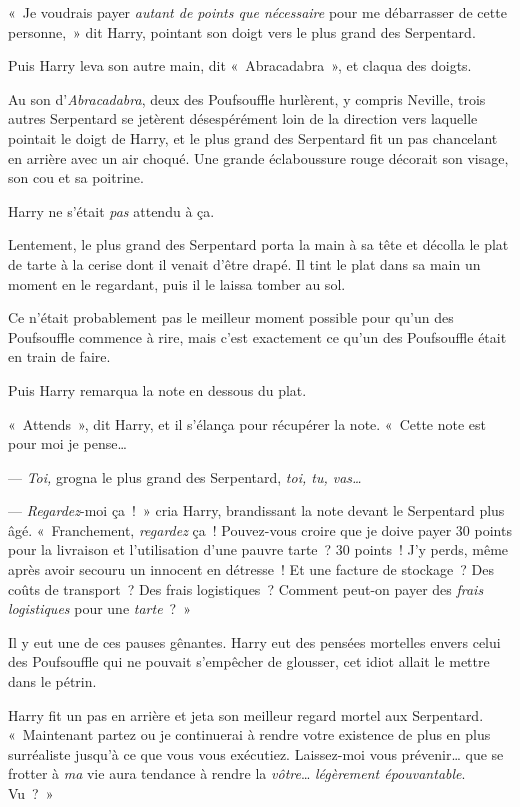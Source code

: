 «~Je voudrais payer \emph{autant de points que nécessaire} pour me débarrasser de cette personne,~» dit Harry, pointant son doigt vers le plus grand des Serpentard.

Puis Harry leva son autre main, dit «~Abracadabra~», et claqua des doigts.

Au son d'\emph{Abracadabra}, deux des Poufsouffle hurlèrent, y compris Neville, trois autres Serpentard se jetèrent désespérément loin de la direction vers laquelle pointait le doigt de Harry, et le plus grand des Serpentard fit un pas chancelant en arrière avec un air choqué. Une grande éclaboussure rouge décorait son visage, son cou et sa poitrine.

Harry ne s'était \emph{pas} attendu à ça.

Lentement, le plus grand des Serpentard porta la main à sa tête et décolla le plat de tarte à la cerise dont il venait d'être drapé. Il tint le plat dans sa main un moment en le regardant, puis il le laissa tomber au sol.

Ce n'était probablement pas le meilleur moment possible pour qu'un des Poufsouffle commence à rire, mais c'est exactement ce qu'un des Poufsouffle était en train de faire.

Puis Harry remarqua la note en dessous du plat.

«~Attends~», dit Harry, et il s'élança pour récupérer la note. «~Cette note est pour moi je pense…

--- \emph{Toi,} grogna le plus grand des Serpentard, \emph{toi, tu, vas…}

--- \emph{Regardez}-moi ça~!~» cria Harry, brandissant la note devant le Serpentard plus âgé. «~Franchement, \emph{regardez} ça~! Pouvez-vous croire que je doive payer 30 points pour la livraison et l'utilisation d'une pauvre tarte~? 30 points~! J'y perds, même après avoir secouru un innocent en détresse~! Et une facture de stockage~? Des coûts de transport~? Des frais logistiques~? Comment peut-on payer des \emph{frais logistiques} pour une \emph{tarte}~?~»

Il y eut une de ces pauses gênantes. Harry eut des pensées mortelles envers celui des Poufsouffle qui ne pouvait s'empêcher de glousser, cet idiot allait le mettre dans le pétrin.

Harry fit un pas en arrière et jeta son meilleur regard mortel aux Serpentard. «~Maintenant partez ou je continuerai à rendre votre existence de plus en plus surréaliste jusqu'à ce que vous vous exécutiez. Laissez-moi vous prévenir… que se frotter à \emph{ma} vie aura tendance à rendre la \emph{vôtre}… \emph{légèrement épouvantable}. Vu~?~»


